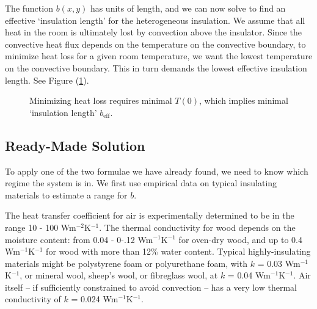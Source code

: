 \documentclass[12pt, a4paper, twoside, openright]{book}
\newcommand{\beff}{\ensuremath{b_{\mathrm{eff}}}}
\newcommand{\Tr}{\ensuremath{T_{\mathrm{room}}}}
\begin{document}
The function $b(x,y)$ has units of length, and we can now solve to find an effective `insulation length' for the heterogeneous insulation.
We assume that all heat in the room is ultimately lost by convection above the insulator.  Since the convective heat flux depends on the temperature on the convective boundary,
  to minimize heat loss for a given room temperature, we want the lowest temperature on the convective boundary.  This in turn demands the lowest effective insulation length.  See Figure (\ref{insulationlength}).

\begin{figure}[ht]
\centering
{}
\caption{Minimizing heat loss requires minimal $T(0)$, which implies minimal `insulation length' $\beff$.}\label{insulationlength}
\end{figure}


\subsection{Ready-Made Solution}

To apply one of the two formulae we have already found, we need to know which regime the system is in.  We first use empirical data on typical insulating materials to estimate a range for $b$. 



The heat transfer coefficient for air is experimentally determined to be in the range 10 - 100 Wm$^{-2}$K$^{-1}$.
The thermal conductivity for wood depends on the moisture content: from 0.04 - 0-.12 Wm$^{-1}$K$^{-1}$ for oven-dry wood, and up to 0.4 Wm$^{-1}$K$^{-1}$ for wood with more than 12\% water content.
Typical highly-insulating materials might be polystyrene foam or polyurethane foam, with $k$ = 0.03 Wm$^{-1}$K$^{-1}$, or mineral wool, sheep's wool, or fibreglass wool, at $k$ = 0.04 Wm$^{-1}$K$^{-1}$.
Air itself -- if sufficiently constrained to avoid convection -- has a very low thermal conductivity of $k$ = 0.024 Wm$^{-1}$K$^{-1}$.
\end{document}
